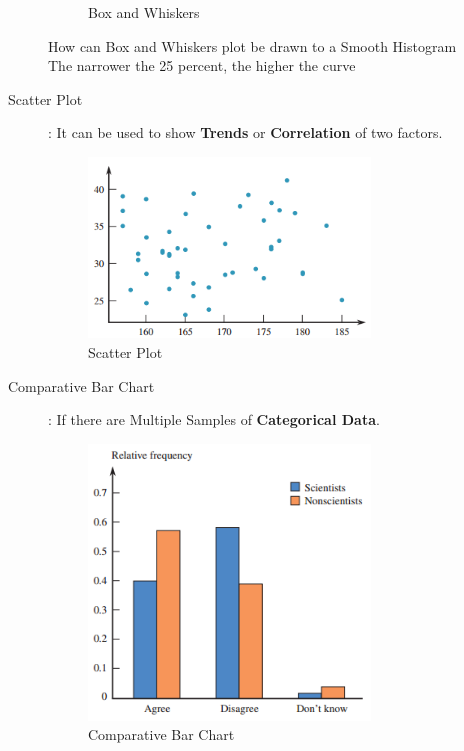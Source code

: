 \begin{description}
\begin{description}
\begin{figure}[H]
            \caption{Box and Whiskers}
            \label{box and whiskers}
        \end{figure}
        \begin{Question}
            How can Box and Whiskers plot be drawn to a Smooth Histogram
            \solution The narrower the 25 percent, the higher the curve
        \end{Question}
        \item[Scatter Plot]: It can be used to show \textbf{Trends} or \textbf{Correlation} of two factors.
        \begin{figure}[H]
            \centering
            \includegraphics[width=75mm]{scatter.png}
            \caption{Scatter Plot}
            \label{scatter plot}
        \end{figure}
       
        \item[Comparative Bar Chart]: If there are Multiple Samples of \textbf{Categorical Data}.
        \begin{figure}[H]
            \centering
            \includegraphics[width=75mm]{comparative_bar_chart.png}
            \caption{Comparative Bar Chart}
            \label{comparative bar chart}
        \end{figure}
    \end{description}
\end{description} 

